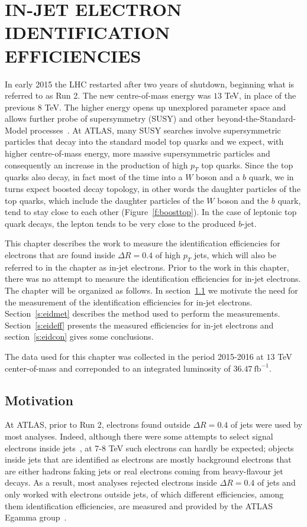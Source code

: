 \chapter{IN-JET ELECTRON IDENTIFICATION EFFICIENCIES}\label{c:eid}

In early 2015 the LHC restarted after two years of shutdown, beginning what is
referred to as Run 2. The new centre-of-mass energy was $13$ TeV, in place of
the previous $8$ TeV. The higher energy opens up unexplored parameter space and
allows further probe of supersymmetry (SUSY) and other
beyond-the-Standard-Model processes~\cite{multib-c7, stop-c7, ttresonance-c7,
	vlq-c7}. At ATLAS, many SUSY searches involve supersymmetric particles that
decay into the standard model top quarks and we expect, with higher
centre-of-mass energy, more massive supersymmetric particles and consequently
an increase in the production of high $p_T$ top quarks. Since the top quarks
also decay, in fact most of the time into a $W$ boson and a $b$ quark, we in
turns expect boosted decay topology, in other words the daughter particles of
the top quarks, which include the daughter particles of the $W$ boson and the
$b$ quark, tend to stay close to each other (Figure~\ref{f:boosttop}). In the
case of leptonic top quark decays, the lepton tends to be very close to the
produced $b$-jet.


This chapter describes the work to measure the identification efficiencies for
electrons that are found inside $\Delta R = 0.4$ of high $p_T$ jets, which will
also be referred to in the chapter as in-jet electrons. Prior to the work in
this chapter, there was no attempt to measure the identification efficiencies
for in-jet electrons. The chapter will be organized as follows. In
section~\ref{s:eidmot} we motivate the need for the measurement of the
identification efficiencies for in-jet electrons. Section~\ref{s:eidmet}
describes the method used to perform the measurements. Section~\ref{s:eideff}
presents the measured efficiencies for in-jet electrons and
section~\ref{s:eidcon} gives some conclusions.

The data used for this chapter was collected in the period 2015-2016 at $13$
TeV center-of-mass and correponded to an integrated luminosity of
$36.47~\text{fb}^{-1}$.

\section{Motivation}\label{s:eidmot}

At ATLAS, prior to Run 2, electrons found outside $\Delta R = 0.4$ of jets were
used by most analyses. Indeed, although there were some attempts to select
signal electrons inside jets~\cite{?}, at 7-8 TeV such electrons can hardly be
expected; objects inside jets that are identified as electrons are mostly
background electrons that are either hadrons faking jets or real electrons
coming from heavy-flavour jet decays. As a result, most analyses rejected
electrons inside $\Delta R = 0.4$ of jets and only worked with electrons
outside jets, of which different efficiencies, among them identification
efficiencies, are measured and provided by the ATLAS Egamma
group~\cite{atlaselcid}.

